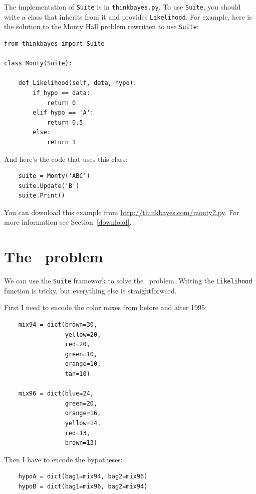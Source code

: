 \documentclass[12pt]{book}
\begin{document}
The implementation of \verb"Suite" is in \verb"thinkbayes.py".  To use
\verb"Suite", you should write a class that inherits from it and
provides \verb"Likelihood".  For example, here is the solution to the
Monty Hall problem rewritten to use \verb"Suite":

\begin{verbatim}
from thinkbayes import Suite

class Monty(Suite):

    def Likelihood(self, data, hypo):
        if hypo == data:
            return 0
        elif hypo == 'A':
            return 0.5
        else:
            return 1
\end{verbatim}

And here's the code that uses this class:

\begin{verbatim}
    suite = Monty('ABC')
    suite.Update('B')
    suite.Print()
\end{verbatim}

You can download this example from
\url{http://thinkbayes.com/monty2.py}.
  For more information
see Section~\ref{download}.


\section{The \MM~problem}

We can use the \verb"Suite" framework to solve the \MM~problem.
Writing the \verb"Likelihood" function is tricky, but everything
else is straightforward.

First I need to encode the color mixes from before and
after 1995:

\begin{verbatim}
    mix94 = dict(brown=30,
                 yellow=20,
                 red=20,
                 green=10,
                 orange=10,
                 tan=10)

    mix96 = dict(blue=24,
                 green=20,
                 orange=16,
                 yellow=14,
                 red=13,
                 brown=13)
\end{verbatim}

Then I have to encode the hypotheses:

\begin{verbatim}
    hypoA = dict(bag1=mix94, bag2=mix96)
    hypoB = dict(bag1=mix96, bag2=mix94)
\end{verbatim}
\end{document}

